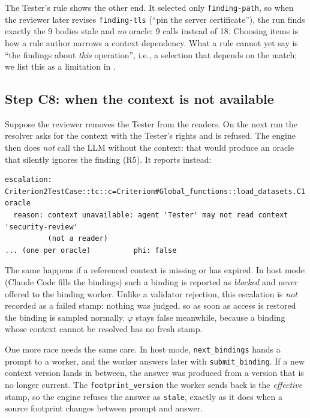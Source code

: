 \documentclass[10pt,a4paper]{article}
\newcommand{\code}[1]{\texttt{#1}}
\theoremstyle{definition}
\begin{document}
The Tester's rule shows the other end. It selected only
\code{finding-path}, so when the reviewer later revises \code{finding-tls}
(``pin the server certificate''), the run finds exactly the 9 bodies stale and
\emph{no} oracle: 9 calls instead of 18. Choosing items is how a rule author
narrows a context dependency. What a rule cannot yet say is ``the findings
about \emph{this} operation'', i.e., a selection that depends on the match;
we list this as a limitation in .

\subsection{Step C8: when the context is not available}\label{sec:context-failsafe}

Suppose the reviewer removes the Tester from the readers. On the next run the
resolver asks for the context with the Tester's rights and is refused. The engine then does \emph{not} call the LLM without the context:
that would produce an oracle that silently ignores the finding (R5). It
reports instead:

\begin{lstlisting}[style=engine, caption={Engine output when the Tester may no longer read the context.}]
escalation: Criterion2TestCase::tc::c=Criterion#Global_functions::load_datasets.C1  oracle
  reason: context unavailable: agent 'Tester' may not read context 'security-review'
          (not a reader)
... (one per oracle)          phi: false
\end{lstlisting}

\noindent The same happens if a referenced context is missing or has
expired. In host mode (Claude Code fills the bindings) such a binding is
reported as \emph{blocked} and never offered to the binding worker. Unlike a
validator rejection, this escalation is \emph{not} recorded as a failed
stamp: nothing was judged, so as soon as access is restored the binding is
sampled normally. $\varphi$ stays false meanwhile, because a binding whose
context cannot be resolved has no fresh stamp.

One more race needs the same care. In host mode, \code{next\_bindings} hands
a prompt to a worker, and the worker answers later with
\code{submit\_binding}. If a new context version lands in between, the
answer was produced from a version that is no longer current. The
\code{footprint\_version} the worker sends back is the \emph{effective}
stamp, so the engine refuses the answer as \code{stale}, exactly as it does
when a source footprint changes between prompt and answer.
\end{document}
